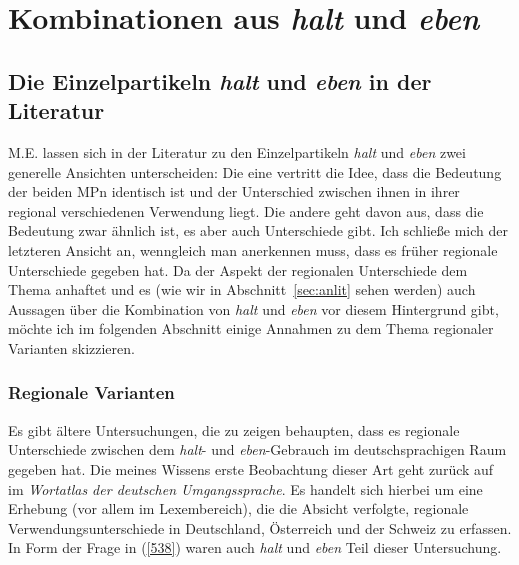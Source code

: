\chapter{Kombinationen aus \textit{halt} und \textit{eben}}
\label{chapter:hue}
\section{Die Einzelpartikeln \textit{halt} und \textit{eben} in der Literatur}
\label{sec:hueinliteratur}
M.E. lassen sich in der Literatur zu den Einzelpartikeln \textit{halt} und \textit{eben} zwei generelle Ansichten unterscheiden: Die eine vertritt die Idee, dass die Bedeutung der beiden MPn identisch ist und der Unterschied zwischen ihnen in ihrer regional verschiedenen Verwendung liegt. Die andere geht davon aus, dass die Bedeutung zwar ähnlich ist, es aber auch Unterschiede gibt. Ich schließe mich der letzteren Ansicht an, wenngleich man anerkennen muss, dass es früher regionale Unterschiede gegeben hat. Da der Aspekt der regionalen Unterschiede dem Thema anhaftet und es (wie wir in Abschnitt~\ref{sec:anlit} sehen werden) auch Aussagen über die Kombination von \textit{halt} und \textit{eben} vor diesem Hintergrund gibt, möchte ich im folgenden Abschnitt einige Annahmen zu dem Thema regionaler Varianten skizzieren.

\subsection{Regionale Varianten}
\label{sec:regio}
Es gibt ältere Untersuchungen, die zu zeigen behaupten, dass es regionale Unterschiede zwischen dem \textit{halt}- und \textit{eben}-Gebrauch im deutschsprachigen Raum gegeben hat. Die meines Wissens erste Beobachtung dieser Art geht zurück auf \citet{Eichhoff1978} im \textit{Wortatlas der deutschen Umgangssprache}. Es handelt sich hierbei um eine Erhebung (vor allem im Lexembereich), die die Absicht verfolgte, regionale Verwendungsunterschiede in Deutschland, Österreich und der Schweiz zu erfassen. In Form der Frage in (\ref{538}) waren auch \textit{halt} und \textit{eben} Teil dieser Untersuchung.

